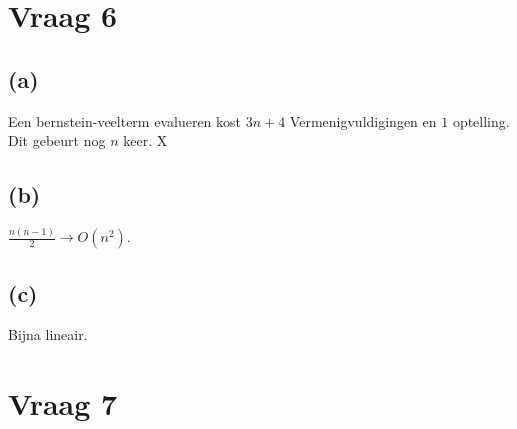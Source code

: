 \documentclass[10pt,a4paper]{article}
\begin{document}
\section{Vraag 6}
\subsection*{(a)}
Een bernstein-veelterm evalueren kost $3n+4$ Vermenigvuldigingen en $1$ optelling. Dit gebeurt nog $n$ keer. X

\subsection*{(b)}
$\frac{n(n-1)}{2} \rightarrow O(n^2)$.

\subsection*{(c)}
Bijna lineair.

\section{Vraag 7}


\end{document}
